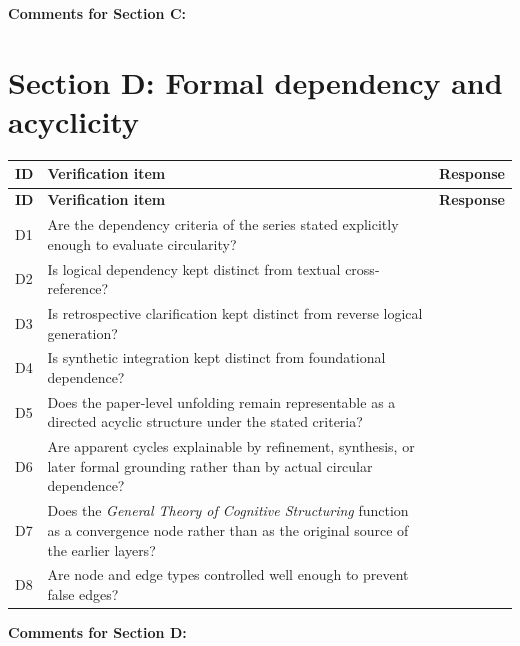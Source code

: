 \documentclass[11pt,a4paper]{article}
\begin{document}
	\textbf{Comments for Section C:}
	
	\vspace{3em}
	
	\section{Section D: Formal dependency and acyclicity}
	
	\begin{longtable}{>{\RaggedRight\arraybackslash}p{}
			>{\RaggedRight\arraybackslash}p{}
			>{\RaggedRight\arraybackslash}p{}}
		\toprule
		\textbf{ID} & \textbf{Verification item} & \textbf{Response} \\
		\midrule
		\endfirsthead
		\toprule
		\textbf{ID} & \textbf{Verification item} & \textbf{Response} \\
		\midrule
		\endhead
		
		D1 & Are the dependency criteria of the series stated explicitly enough to evaluate circularity? & \\
		
		D2 & Is logical dependency kept distinct from textual cross-reference? & \\
		
		D3 & Is retrospective clarification kept distinct from reverse logical generation? & \\
		
		D4 & Is synthetic integration kept distinct from foundational dependence? & \\
		
		D5 & Does the paper-level unfolding remain representable as a directed acyclic structure under the stated criteria? & \\
		
		D6 & Are apparent cycles explainable by refinement, synthesis, or later formal grounding rather than by actual circular dependence? & \\
		
		D7 & Does the \emph{General Theory of Cognitive Structuring} function as a convergence node rather than as the original source of the earlier layers? & \\
		
		D8 & Are node and edge types controlled well enough to prevent false edges? & \\
		
		\bottomrule
	\end{longtable}
	
	\textbf{Comments for Section D:}
	
\end{document}
